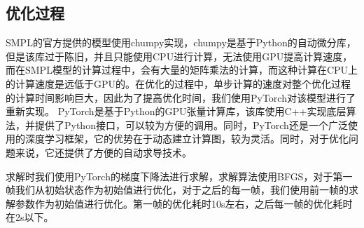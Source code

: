 \subsection{优化过程}
SMPL的官方提供的模型使用chumpy实现，chumpy是基于Python的自动微分库，但是该库过于陈旧，并且只能使用CPU进行计算，无法使用GPU提高计算速度，而在SMPL模型的计算过程中，会有大量的矩阵乘法的计算，而这种计算在CPU上的计算速度是远低于GPU的。在优化的过程中，单步计算的速度对整个优化过程的计算时间影响巨大，因此为了提高优化时间，我们使用PyTorch\cite{pytorch}对该模型进行了重新实现。
PyTorch是基于Python的GPU张量计算库，该库使用C++实现底层算法，并提供了Python接口，可以较为方便的调用。同时，PyTorch还是一个广泛使用的深度学习框架，它的优势在于动态建立计算图，较为灵活。同时，对于优化问题来说，它还提供了方便的自动求导技术。

求解时我们使用PyTorch的梯度下降法进行求解，求解算法使用BFGS，对于第一帧我们从初始状态作为初始值进行优化，对于之后的每一帧，我们使用前一帧的求解参数作为初始值进行优化。第一帧的优化耗时10s左右，之后每一帧的优化耗时在2s以下。



